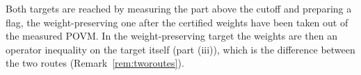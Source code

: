 
Both targets are reached by measuring the part above the cutoff and preparing
a flag, the weight-preserving one after the certified weights have been taken
out of the measured POVM. In the weight-preserving target the weights are
then an operator inequality on the target itself (part (iii)), which is the
difference between the two routes (Remark~\ref{rem:tworoutes}).

